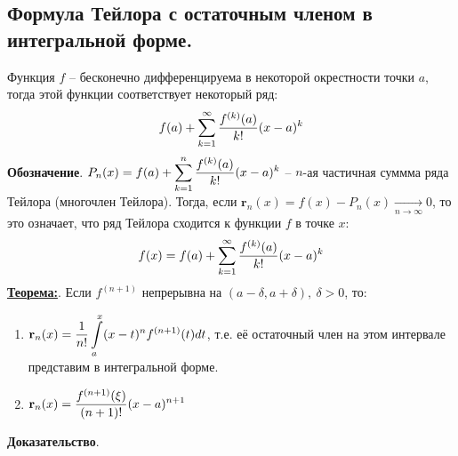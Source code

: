 \documentclass[a4paper,12pt]{article} %
\begin{document}
\subsection{Формула Тейлора с остаточным членом в интегральной форме.}
Функция $f$ -- бесконечно дифференцируема в некоторой окрестности точки $a$, тогда этой функции соответствует некоторый ряд: 
\begin{equation*}
\Large \displaystyle f(a) + \sum\limits_{k = 1}^{\infty} \frac{f^{(k)}(a)}{k!}(x-a)^k
\end{equation*}
\textbf{Обозначение}. $\Large \displaystyle P_n(x) = f(a) + \sum\limits_{k = 1}^{n} \frac{f^{(k)}(a)}{k!}(x-a)^k$ -- $n$-ая частичная суммма ряда Тейлора (многочлен Тейлора).
Тогда, если $\mathbf{r}_n(x) = f(x) - P_n(x) \underset{n \rightarrow \infty} \longrightarrow 0$, то это означает, что ряд Тейлора сходится к функции $f$ в точке $x$:
\begin{equation*}
\Large \displaystyle f(x) = f(a) + \sum\limits_{k = 1}^{\infty} \frac{f^{(k)}(a)}{k!}(x-a)^k
\end{equation*}
\underline{\textbf{Теорема:}}. Если $f^{(n+1)}$ непрерывна на $(a - \delta, a + \delta),\ \delta > 0$, то:
\begin{enumerate}
\item $\Large \displaystyle \mathbf{r}_n(x) = \frac{1}{n!} \int\limits_{a}^{x} (x - t)^nf^{(n+1)}(t)dt$, т.е. её остаточный член на этом интервале представим в интегральной форме.
\item $\Large \displaystyle \mathbf{r}_n(x) = \frac{f^{(n+1)}(\xi)}{(n+1)!}(x-a)^{n+1}$
\end{enumerate}
\textbf{Доказательство}. 
\end{document}

